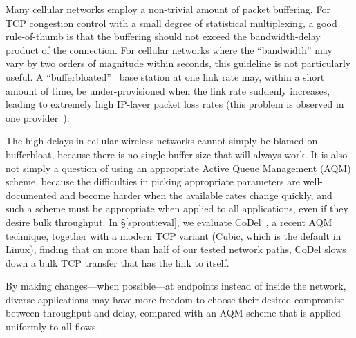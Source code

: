 
Many cellular networks employ a non-trivial amount of packet
buffering. For TCP congestion control with a small degree of
statistical multiplexing, a good rule-of-thumb is that the buffering
should not exceed the bandwidth-delay product of the connection. For
cellular networks where the ``bandwidth'' may vary by two orders of
magnitude within seconds, this guideline is not particularly useful. A
``bufferbloated''~\cite{bufferbloat} base station at one link rate
may, within a short amount of time, be under-provisioned when the link
rate suddenly increases, leading to extremely high IP-layer packet
loss rates (this problem is observed in one
provider~\cite{Mahajan12}).

The high delays in cellular wireless networks cannot simply be blamed
on bufferbloat, because there is no single buffer size that will
always work. It is also not simply a question of using an appropriate
Active Queue Management (AQM) scheme, because the difficulties in
picking appropriate parameters are well-documented and become harder
when the available rates change quickly, and such a scheme must be
appropriate when applied to all applications, even if they desire bulk
throughput. In \S\ref{sprout:eval}, we evaluate CoDel~\cite{CoDel}, a
recent AQM technique, together with a modern TCP variant (Cubic, which
is the default in Linux), finding that on more than half of our tested
network paths, CoDel slows down a bulk TCP transfer that has the link
to itself.
%

By making changes---when possible---at endpoints
instead of inside the network, diverse applications may have more
freedom to choose their desired compromise between throughput and
delay, compared with an AQM scheme that is applied uniformly to all
flows.


